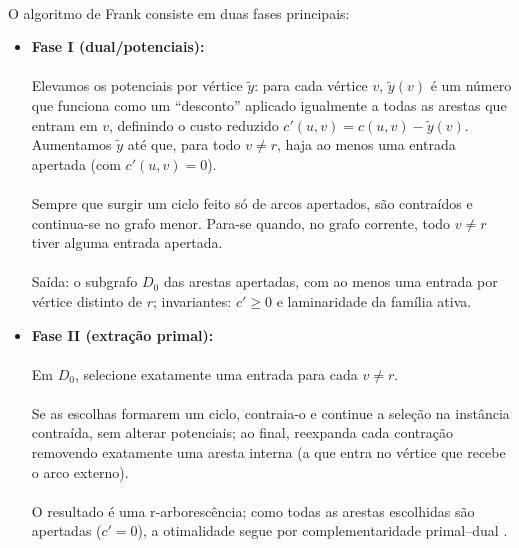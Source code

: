 \documentclass[12pt,a4paper]{article}
\def\emph#1{#1}%
\begin{document}
\paragraph{}
O algoritmo de Frank consiste em duas fases principais:
\begin{itemize}\setlength{\itemsep}{2pt}
    \item \textbf{Fase I (dual/potenciais):} 
    \paragraph{}
    Elevamos os potenciais por vértice \(\tilde y\): para cada vértice \(v\), \(\tilde y(v)\) é um número que funciona como um “desconto” aplicado igualmente a todas as arestas que \emph{entram} em \(v\), definindo o custo reduzido \(c'(u,v)=c(u,v)-\tilde y(v)\). Aumentamos \(\tilde y\) até que, para todo \(v\neq r\), haja ao menos uma entrada \emph{apertada} (com \(c'(u,v)=0\)). 
    
    \paragraph{}
    Sempre que surgir um ciclo feito só de arcos apertados, são contraídos e continua-se no grafo menor. Para-se quando, no grafo corrente, todo \(v\neq r\) tiver alguma entrada apertada. 
    
    \paragraph{}
    Saída: o subgrafo \(D_0\) das arestas apertadas, com ao menos uma entrada por vértice distinto de \(r\); invariantes: \(c'\ge 0\) e laminaridade da família ativa.
    \item \textbf{Fase II (extração primal):} 
    \paragraph{}
    Em \(D_0\), selecione exatamente uma entrada para cada \(v\neq r\). 
    \paragraph{}
    Se as escolhas formarem um ciclo, contraia-o e continue a seleção na instância contraída, \emph{sem} alterar potenciais; ao final, reexpanda cada contração removendo exatamente uma aresta interna (a que entra no vértice que recebe o arco externo). 
    \paragraph{}
    O resultado é uma r‑arborescência; como todas as arestas escolhidas são apertadas (\(c'=0\)), a otimalidade segue por complementaridade primal–dual \cite{frank1981,frank2014,schrijver2003comb}.
\end{itemize}
\end{document}
